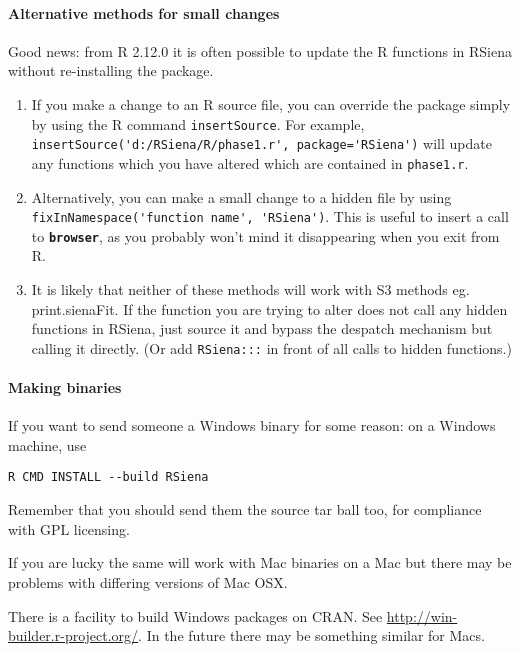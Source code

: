 \documentclass[12pt, a4paper]{article}
\renewcommand{\=}{\,=\,}
\newcommand{\+}{\,+\,}
\newcommand{\sfn}[1]{\textbf{\texttt{#1}}}
\begin{document}
\paragraph{Alternative methods for small changes}
Good news: from R 2.12.0 it is often possible to update the R functions in
RSiena without re-installing the
package.
\begin{enumerate}
\item If you make a change to an R source file, you can override the package
  simply by using the R command \verb|insertSource|. For example,
  \verb|insertSource('d:/RSiena/R/phase1.r', package='RSiena')| will update any
  functions which you have altered which are contained in \verb|phase1.r|.
\item Alternatively, you can make a small change to a hidden file by using
  \verb|fixInNamespace('function name', 'RSiena')|.  This is useful to insert a
  call to \sfn{browser}, as you probably won't mind it disappearing when you
  exit from R.
\item It is likely that neither of these methods will work with S3 methods
  eg. print.sienaFit. If the function you are trying to alter does not call any
  hidden functions in RSiena, just source it and bypass the despatch mechanism
  but calling it directly. (Or add \verb|RSiena:::| in front of all calls to
  hidden functions.)
\end{enumerate}
\paragraph{Making  binaries}
If you want to send someone a Windows binary for some reason: on a Windows
machine, use

\verb|R CMD INSTALL --build RSiena|

Remember that you should send them the source tar ball too, for compliance with
GPL licensing.

If you are lucky the same will work with Mac binaries on a Mac but there may be
problems with differing versions of Mac OSX.

There is a facility to build Windows packages on CRAN. See
\url{http://win-builder.r-project.org/}. In the future there may be something
similar for Macs.
\end{document}
